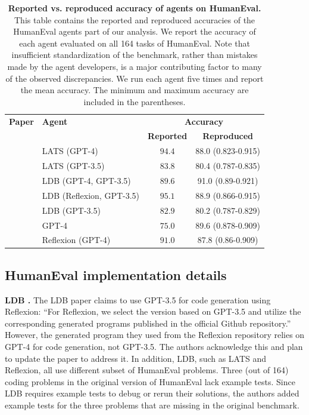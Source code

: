 \documentclass{article}
\begin{document}
\begin{table}[h]\small
        \centering
        {
        \begin{tabular}{l|l|cc}
        \toprule
    \multicolumn{1}{l|}{\textbf{Paper}} & \multicolumn{1}{l|}{\textbf{Agent}}  &  \multicolumn{2}{c}{\textbf{Accuracy}}
    \\
   & & \textbf{Reported} & \textbf{Reproduced}  \\
    \midrule
   \citet{zhou_language_2023}
    & LATS (GPT-4) & $94.4$ & 88.0 (0.823-0.915) \\
    & LATS (GPT-3.5) & $83.8$ & 80.4 (0.787-0.835) \\
    \midrule
   \citet{zhong_ldb_2024}
    & LDB (GPT-4, GPT-3.5) & $89.6$ &\hspace{-0.15cm}91.0 (0.89-0.921) \\
    & LDB (Reflexion, GPT-3.5) & $95.1$ & 88.9 (0.866-0.915) \\
    & LDB (GPT-3.5) & $82.9$ & 80.2 (0.787-0.829) \\
    & GPT-4 & $75.0$ & 89.6 (0.878-0.909)\\
    \midrule
   \citet{shinn_reflexion_2023}
    & Reflexion (GPT-4) & $91.0$ &87.8 (0.86-0.909) \\
    \bottomrule 
    \end{tabular}
    }
\caption{\textbf{Reported vs. reproduced accuracy of agents on HumanEval.} This table contains the reported and reproduced accuracies of the HumanEval agents part of our analysis. We report the accuracy of each agent evaluated on all 164 tasks of HumanEval. Note that insufficient standardization of the benchmark, rather than mistakes made by the agent developers, is a major contributing factor to many of the observed discrepancies. We run each agent five times and report the mean accuracy. The minimum and maximum accuracy are included in the parentheses.}
\label{tab:reproduc-humaneval}
\end{table}

\subsection{HumanEval implementation details}
\label{appendix:reprod-implementation}

\textbf{LDB \citep{zhong_ldb_2024}.} The LDB paper claims to use GPT-3.5 for code generation using Reflexion: ``For Reflexion, we select the version based on GPT-3.5 and utilize the corresponding generated programs published in the official Github repository.'' However, the generated program they used from the Reflexion repository relies on GPT-4 for code generation, not GPT-3.5. The authors acknowledge this and plan to update the paper to address it. In addition, LDB, such as LATS and Reflexion, all use different subset of HumanEval problems. Three (out of 164) coding problems in the original version of HumanEval lack example tests. Since LDB requires example tests to debug or rerun their solutions, the authors added example tests for the three problems that are missing in the original benchmark.
\end{document}
